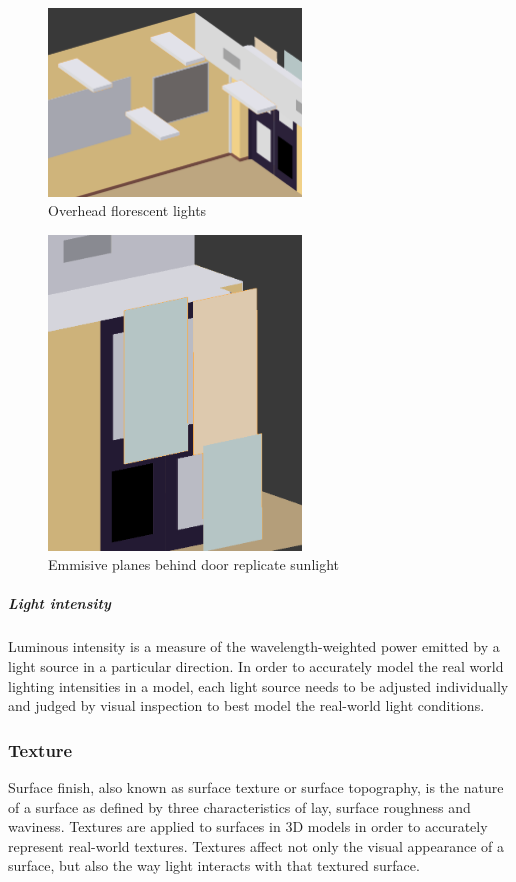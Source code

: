 \documentclass[11pt,a4paper]{report}
\begin{document}
						\begin{figure}[H]
							\centering
							\includegraphics[width=0.6\textwidth]{overhead_lights}
							\caption{Overhead florescent lights}
						\end{figure}
						\begin{figure}[H]
							\centering
							\includegraphics[width=0.6\textwidth]{lights_behind_door}
							\caption{Emmisive planes behind door replicate sunlight}
						\end{figure}
					
					\subparagraph{Light intensity}
						Luminous intensity is a measure of the wavelength-weighted power emitted by a light source in a particular direction. In order to accurately model the real world lighting intensities in a model, each light source needs to be adjusted individually and judged by visual inspection to best model the real-world light conditions.
						
			\subsubsection{Texture}
				Surface finish, also known as surface texture or surface topography, is the nature of a surface as defined by three characteristics of lay, surface roughness and waviness.
				\cite{e._paul_degarmo_materials_2003}
				Textures are applied to surfaces in 3D models in order to accurately represent real-world textures. Textures affect not only the visual appearance of a surface, but also the way light interacts with that textured surface.
					
\end{document}
